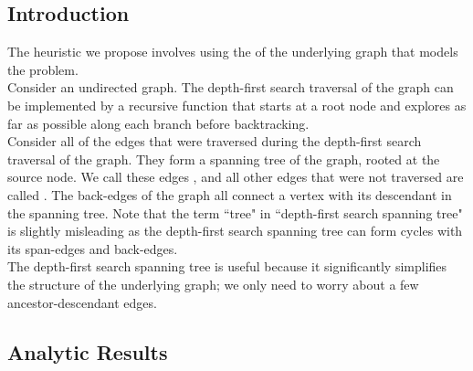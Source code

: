 \documentclass[12pt]{scrartcl}
\begin{document}
\subsection{Introduction}
The heuristic we propose involves using the  of the underlying graph that models the problem. \\%

Consider an undirected graph. The depth-first search traversal of the graph can be implemented by a recursive function that starts at a root node and explores as far as possible along each branch before backtracking. \\ %

Consider all of the edges that were traversed during the depth-first search traversal of the graph. They form a spanning tree of the graph, rooted at the source node. We call these edges , and all other edges that were not traversed are called . The back-edges of the graph all connect a vertex with its descendant in the spanning tree. Note that the term ``tree" in ``depth-first search spanning tree" is slightly misleading as the depth-first search spanning tree can form cycles with its span-edges and back-edges. \\

The depth-first search spanning tree is useful because it significantly simplifies the structure of the underlying graph; we only need to worry about a few ancestor-descendant edges. 
\fi

\iffalse
\section{Dominated Strategies}

\noindent Prior to proposing various heuristics, we note the following observations that must be taken into account when designing our heuristic: 

\begin{quote}
    Suppose we visit a service stop $a_i \in S'$ with the primary and helper vehicles both available. It is never advantageous to service $a_i$ with the primary vehicle since we can instead service $a_i$ with the helper vehicle and possibly satisfy even more demands with the primary vehicle. 
\end{quote}
\fi



\iffalse
\subsection{Analytic Results}
\end{document}
